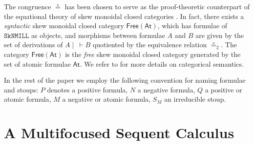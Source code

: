 \documentclass[runningheads]{llncs}
\newcommand{\SkNMILL}{\texttt{SkNMILL}}
\newcommand{\FSkMCC}{\mathsf{Free}}
\newcommand{\At}{\mathsf{At}}
\begin{document}
The congruence $\circeq$ has been chosen to serve as the proof-theoretic counterpart of the equational theory of skew monoidal closed categories \cite{street:skew-closed:2013}.
In fact, there exists a \emph{syntactic} skew monoidal closed category $\FSkMCC(\At)$, which has formulae of $\SkNMILL$ as objects, and morphisms between formulae $A$ and $B$ are given by the set of derivations of $A \mid ~ \vdash B$ quotiented by the equivalence relation $\circeq_2$. The category $\FSkMCC(\At)$ is the \emph{free} skew monoidal closed category generated by the set of atomic formulae $\At$. We refer to \cite{UVW:protsn} for more details on categorical semantics.

In the rest of the paper we employ the following convention for naming formulae and stoups:
$P$ denotes a positive formula, $N$ a negative formula, $Q$ a positive or atomic formula, $M$ a negative or atomic formula, $S_M$ an irreducible stoup.





\section{A Multifocused Sequent Calculus}\label{sec:focus}
\end{document}
